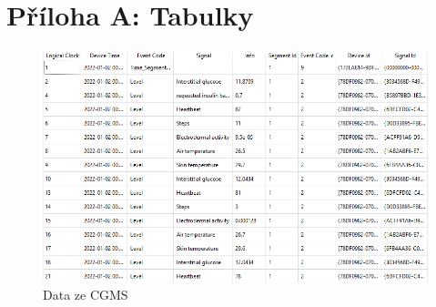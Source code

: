 \chapter*{Příloha A: Tabulky}


\begin{figure}[H]
\caption{Data ze CGMS}
\centering
\begin{sideways}
\includegraphics[height=0.28\textheight]{img/cho/cgms_data.png}
\end{sideways}
\end{figure}
